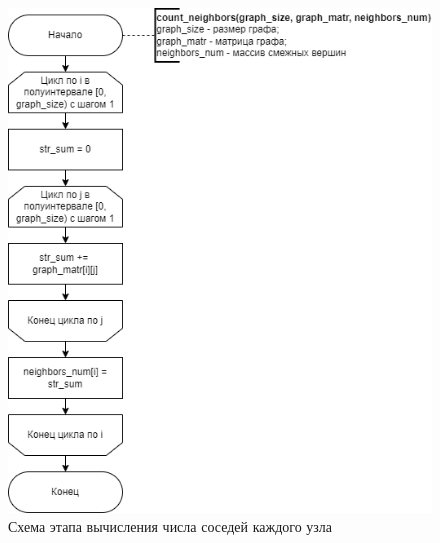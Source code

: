 \begin{figure}[h!btp]
	\centering
	\includegraphics[width=360pt]{inc/count_neighbors.png}
	\caption{Схема этапа вычисления числа соседей каждого узла}
	\label{fig:count_neighbors}	
\end{figure}

\clearpage

